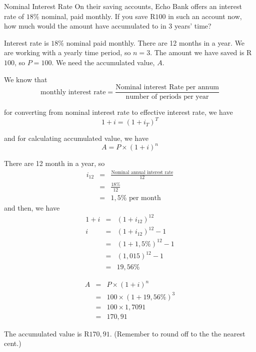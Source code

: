 \begin{wex}{Nominal Interest Rate}
{On their saving accounts, Echo Bank offers an interest rate of $18\%$ nominal,
paid monthly. If you save R$100$ in such an account now, how much would the amount
have accumulated to in 3 years' time?\\}
{
Interest rate is $18\%$
nominal paid monthly. There are 12 months in a year. We are working with a
yearly time period, so $n = 3$. The amount we have saved is R$100$, so $P =
100$. We need the accumulated value, $A$.

 We know that
\begin{displaymath}
\mbox{monthly interest rate} =
\frac{\mbox{Nominal interest Rate per annum}}{\mbox{number of periods per
year}}
\end{displaymath}

for converting from nominal interest rate to effective interest rate, we have
\begin{displaymath}
	1 + i = (1 + i_T)^T
\end{displaymath}

and for calculating accumulated value, we have
\begin{displaymath}
	A = P \times (1 + i)^n
\end{displaymath}
	
There are 12 month in a year, so
\begin{eqnarray*}
	i_{12} &=& \frac{\mbox{Nominal annual interest rate}}{12}\\
	&=& \frac{18\%}{12}\\
	&=& 1,5\% \mbox{ per month}
\end{eqnarray*}
and then, we have
\begin{eqnarray*}
	1 + i &=& (1 + i_{12})^{12}\\
	i &=& (1 + i_{12})^{12} - 1\\
	&=& (1 + 1,5\%)^{12} - 1\\
	&=& (1,015)^{12} - 1\\
	&=& 19,56\%
\end{eqnarray*}

\begin{eqnarray*}
	A &=& P \times (1 + i)^n\\
	&=& 100 \times (1 + 19,56\%)^3\\
	&=& 100 \times 1,7091\\
	&=& 170,91
\end{eqnarray*}

The accumulated value is R$170,91$. (Remember to round off to the the nearest cent.)
}
\end{wex}

